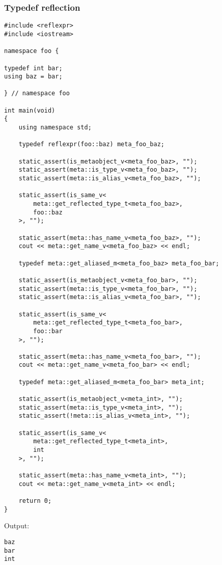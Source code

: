 \subsubsection{Typedef reflection}

\begin{verbatim}
#include <reflexpr>
#include <iostream>

namespace foo {

typedef int bar;
using baz = bar;

} // namespace foo

int main(void)
{
	using namespace std;

	typedef reflexpr(foo::baz) meta_foo_baz;

	static_assert(is_metaobject_v<meta_foo_baz>, "");
	static_assert(meta::is_type_v<meta_foo_baz>, "");
	static_assert(meta::is_alias_v<meta_foo_baz>, "");

	static_assert(is_same_v<
		meta::get_reflected_type_t<meta_foo_baz>,
		foo::baz
	>, "");

	static_assert(meta::has_name_v<meta_foo_baz>, "");
	cout << meta::get_name_v<meta_foo_baz> << endl;

	typedef meta::get_aliased_m<meta_foo_baz> meta_foo_bar;

	static_assert(is_metaobject_v<meta_foo_bar>, "");
	static_assert(meta::is_type_v<meta_foo_bar>, "");
	static_assert(meta::is_alias_v<meta_foo_bar>, "");

	static_assert(is_same_v<
		meta::get_reflected_type_t<meta_foo_bar>,
		foo::bar
	>, "");

	static_assert(meta::has_name_v<meta_foo_bar>, "");
	cout << meta::get_name_v<meta_foo_bar> << endl;

	typedef meta::get_aliased_m<meta_foo_bar> meta_int;

	static_assert(is_metaobject_v<meta_int>, "");
	static_assert(meta::is_type_v<meta_int>, "");
	static_assert(!meta::is_alias_v<meta_int>, "");

	static_assert(is_same_v<
		meta::get_reflected_type_t<meta_int>,
		int
	>, "");

	static_assert(meta::has_name_v<meta_int>, "");
	cout << meta::get_name_v<meta_int> << endl;

	return 0;
}

\end{verbatim}

Output:

\begin{verbatim}
baz
bar
int
\end{verbatim}

